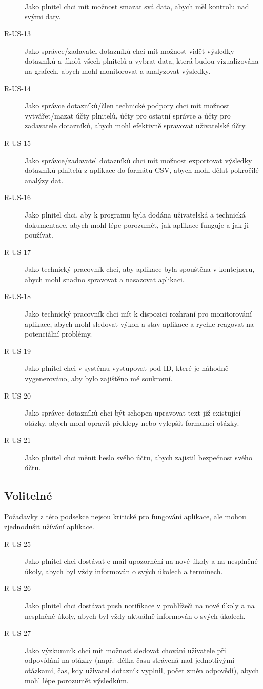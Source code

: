 \begin{description}
    Jako plnitel chci mít možnost smazat svá data, abych měl kontrolu nad svými daty.
    \item[R-US-13]
    Jako správce/zadavatel dotazníků chci mít možnost vidět výsledky dotazníků a úkolů všech plnitelů a vybrat data, která budou vizualizována na grafech, abych mohl monitorovat a analyzovat výsledky.
    \item[R-US-14]
    Jako správce dotazníků/člen technické podpory chci mít možnost vytvářet/mazat účty plnitelů, účty pro ostatní správce a účty pro zadavatele dotazníků, abych mohl efektivně spravovat uživatelské účty.
    \item[R-US-15]
    Jako správce/zadavatel dotazníků chci mít možnost exportovat výsledky dotazníků plnitelů z aplikace do formátu CSV, abych mohl dělat pokročilé analýzy dat.
    \item[R-US-16]
    Jako plnitel chci, aby k programu byla dodána uživatelská a technická dokumentace, abych mohl lépe porozumět, jak aplikace funguje a jak ji používat.
    \item[R-US-17]
    Jako technický pracovník chci, aby aplikace byla spouštěna v kontejneru, abych mohl snadno spravovat a nasazovat aplikaci.
    \item[R-US-18]
    Jako technický pracovník chci mít k dispozici rozhraní pro monitorování aplikace, abych mohl sledovat výkon a stav aplikace a rychle reagovat na potenciální problémy.
    \item[R-US-19]
    Jako plnitel chci v systému vystupovat pod ID, které je náhodně vygenerováno, aby bylo zajištěno mé soukromí.
    \item[R-US-20]
    Jako správce dotazníků chci být schopen upravovat text již existující otázky, abych mohl opravit překlepy nebo vylepšit formulaci otázky.
    \item[R-US-21]
    Jako plnitel chci měnit heslo svého účtu, abych zajistil bezpečnost svého účtu.
\end{description}

\subsection{Volitelné}\label{subsec:volitelne}

Požadavky z této podsekce nejsou kritické pro fungování aplikace, ale mohou zjednodušit užívání aplikace.

\begin{description}
    \item[R-US-25]
    Jako plnitel chci dostávat e-mail upozornění na nové úkoly a na nesplněné úkoly, abych byl vždy informován o svých úkolech a termínech.
    \item[R-US-26]
    Jako plnitel chci dostávat push notifikace v prohlížeči na nové úkoly a na nesplněné úkoly, abych byl vždy aktuálně informován o svých úkolech.
    \item[R-US-27]
    Jako výzkumník chci mít možnost sledovat chování uživatele při odpovídání na otázky (např.\ délka času strávená nad jednotlivými otázkami, čas, kdy uživatel dotazník vyplnil, počet změn odpovědí), abych mohl lépe porozumět výsledkům.
\end{description}


